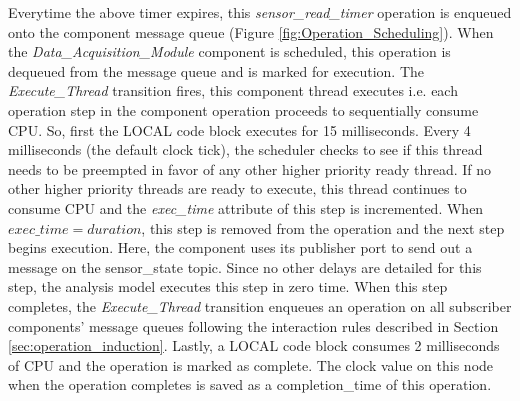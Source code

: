 Everytime the above timer expires, this \emph{sensor\_read\_timer} operation is enqueued onto the component message queue (Figure \ref{fig:Operation_Scheduling}). When the \emph{Data\_Acquisition\_Module} component is scheduled, this operation is dequeued from the message queue and is marked for execution. The \emph{Execute\_Thread} transition fires, this component thread executes i.e. each operation step in the component operation proceeds to sequentially consume CPU. So, first the LOCAL code block executes for 15 milliseconds. Every 4 milliseconds (the default clock tick), the scheduler checks to see if this thread needs to be preempted in favor of any other higher priority ready thread. If no other higher priority threads are ready to execute, this thread continues to consume CPU and the \emph{exec\_time} attribute of this step is incremented. When $exec\_time = duration$, this step is removed from the operation and the next step begins execution. Here, the component uses its publisher port to send out a message on the sensor\_state topic. Since no other delays are detailed for this step, the analysis model executes this step in zero time. When this step completes, the \emph{Execute\_Thread} transition enqueues an operation on all subscriber components' message queues following the interaction rules described in Section \ref{sec:operation_induction}. Lastly, a LOCAL code block consumes 2 milliseconds of CPU and the operation is marked as complete. The clock value on this node when the operation completes is saved as a completion\_time of this operation.  

